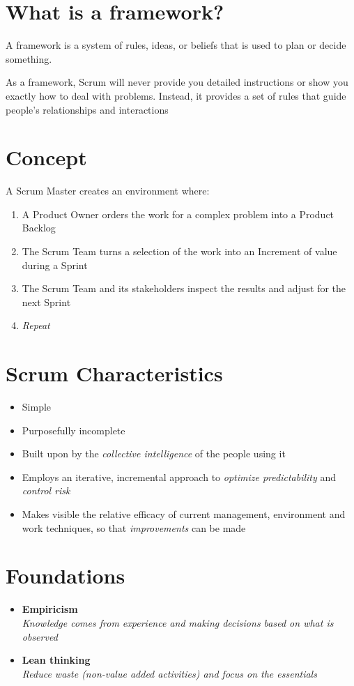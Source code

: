\documentclass[a4paper,11pt,twocolumn]{article}
\begin{document}
\section*{What is a framework?}
A framework is a system of rules, ideas, or beliefs that is used to plan or decide something.

\begin{tcolorbox}[colback=black!8!white,colframe=gray!50!black,title=Note,sharp corners,fonttitle=\normalsize\bfseries,fontupper=\normalsize,left=0.7em,right=0.7em]
	As a framework, Scrum will never provide you detailed instructions or show you exactly how to deal with problems. Instead, it provides a set of rules that guide people's relationships and interactions
\end{tcolorbox}

\section*{Concept}
A Scrum Master creates an environment where:
\begin{enumerate}
	\item A Product Owner orders the work for a complex problem into a Product Backlog
	\item The Scrum Team turns a selection of the work into an Increment of value during a Sprint
	\item The Scrum Team and its stakeholders inspect the results and adjust for the next Sprint
	\item \textit{Repeat}
\end{enumerate}

\section*{Scrum Characteristics}
\begin{itemize}
	\item Simple
	\item Purposefully incomplete
	\item Built upon by the \textit{collective intelligence} of the people using it
	\item Employs an iterative, incremental approach to \textit{optimize predictability} and \textit{control risk}
	\item Makes visible the relative efficacy of current management, environment and work techniques, so that \textit{improvements} can be made
\end{itemize}

\section*{Foundations}
\begin{itemize}
	\item \textbf{Empiricism}\\
	      \textit{Knowledge comes from experience and making decisions based on what is observed}
	\item \textbf{Lean thinking}\\
	      \textit{Reduce waste (non-value added activities) and focus on the essentials}
\end{itemize}
\end{document}

